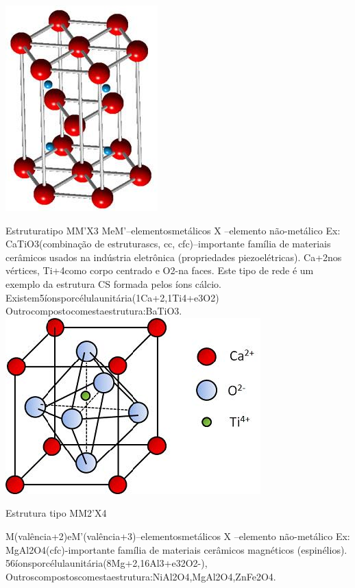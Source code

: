 \includegraphics[scale=0.5,trim={0 0 0 0}]{figures/Al2O3}

Estruturatipo MM'X3
 MeM'–elementosmetálicos
 X –elemento não-metálico
 Ex: CaTiO3(combinação de estruturascs, cc, cfc)–importante família de materiais cerâmicos usados na indústria eletrônica (propriedades piezoelétricas).
 Ca+2nos vértices, Ti+4como corpo centrado e O2-na faces.
 Este tipo de rede é um exemplo da estrutura CS formada pelos íons cálcio.
 Existem5íonsporcélulaunitária(1Ca+2,1Ti4+e3O2)
 Outrocompostocomestaestrutura:BaTiO3.
  \includegraphics[scale=0.5,trim={0 0 0 0}]{figures/CaTiO}
  
  
Estrutura tipo MM2'X4

M(valência+2)eM'(valência+3)–elementosmetálicos
X –elemento não-metálico
Ex: MgAl2O4(cfc)-importante família de materiais cerâmicos magnéticos (espinélios).
56íonsporcélulaunitária(8Mg+2,16Al3+e32O2-),
Outroscompostoscomestaestrutura:NiAl2O4,MgAl2O4,ZnFe2O4.

